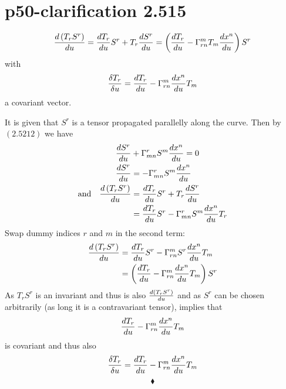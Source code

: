 \section{p50-clarification 2.515 }
\begin{tcolorbox}
$$\dv{\left(T_rS^r\right)}{u} = \dv{T_r}{u}S^r + T_r\dv{S^r}{u} = \left(\dv{T_r}{u} - \Gamma^m_{rn}T_m\dv{x^n}{u}\right)S^r$$ with $$\frac{\delta T_r}{\delta u} = \dv{T_r}{u} -\Gamma^m_{rn}\dv{x^n}{u} T_m$$ a covariant vector.
\end{tcolorbox}
It is given that $S^r$ is a tensor propagated parallelly along the curve. Then by $\mathbf{(2.5212)}$ we have
\begin{align}
\dv{S^r}{u} &+ \Gamma^r_{mn}S^m\dv{x^n}{u}= 0\\
\dv{S^r}{u} &= - \Gamma^r_{mn}S^m\dv{x^n}{u}\\
\text{and}\quad \dv{\left(T_rS^r\right)}{u} &= \dv{T_r}{u}S^r + T_r\dv{S^r}{u} \\
\ &= \dv{T_r}{u}S^r -\Gamma^r_{mn}S^m\dv{x^n}{u} T_r\\
\end{align}
Swap dummy indices $r$ and $m$ in the second term:
\begin{align}
\dv{\left(T_rS^r\right)}{u} &= \dv{T_r}{u}S^r -\Gamma^m_{rn}S^r\dv{x^n}{u} T_m\\
\ &= \left(\dv{T_r}{u} -\Gamma^m_{rn}\dv{x^n}{u} T_m\right)S^r\\
\end{align}
As $T_rS^r$ is an invariant and thus is also $\dv{\left(T_rS^r\right)}{u}$ and as $S^r$ can be chosen arbitrarily (as long it is a contravariant tensor), implies that $$\dv{T_r}{u} -\Gamma^m_{rn}\dv{x^n}{u} T_m$$ is covariant and thus also $$\frac{\delta T_r}{\delta u} = \dv{T_r}{u} -\Gamma^m_{rn}\dv{x^n}{u} T_m$$
$$\blacklozenge$$
\newpage

